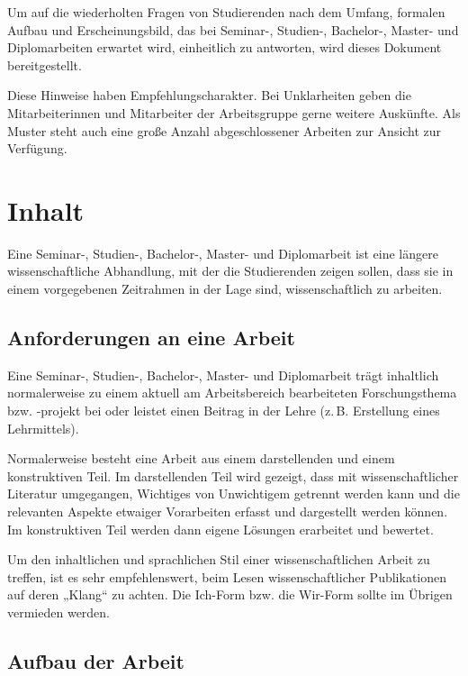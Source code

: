 \documentclass[
    fontsize=12pt,
    headings=small,
    parskip=half,           %
    bibliography=totoc,
    numbers=noenddot,       %
    open=any,               %
    ]{scrreprt}
\begin{document}
Um auf die wiederholten Fragen von Studierenden nach dem Umfang, formalen Aufbau und Erscheinungsbild, das bei Seminar-, Studien-, Bachelor-, Master- und Diplomarbeiten erwartet wird, einheitlich zu antworten, wird dieses Dokument bereitgestellt.

Diese Hinweise haben Empfehlungscharakter. Bei Unklarheiten geben die Mitarbeiterinnen und Mitarbeiter der Arbeitsgruppe gerne weitere Auskünfte. Als Muster steht auch eine große Anzahl abgeschlossener Arbeiten zur Ansicht zur Verfügung.

\chapter{Inhalt}
\label{sec.inhalt}

Eine Seminar-, Studien-, Bachelor-, Master- und Diplomarbeit ist eine längere wissenschaftliche Abhandlung, mit der die Studierenden zeigen sollen, dass sie in einem vorgegebenen Zeitrahmen in der Lage sind, wissenschaftlich zu arbeiten.

\section{Anforderungen an eine Arbeit}
\label{sec.anforderungen}

Eine Seminar-, Studien-, Bachelor-, Master- und Diplomarbeit trägt inhaltlich normalerweise zu einem aktuell am Arbeitsbereich bearbeiteten Forschungsthema bzw. -projekt bei oder leistet einen Beitrag in der Lehre (z.\,B. Erstellung eines Lehrmittels).

Normalerweise besteht eine Arbeit aus einem darstellenden und einem konstruktiven Teil. Im darstellenden Teil wird gezeigt, dass mit wissenschaftlicher Literatur umgegangen, Wichtiges von Unwichtigem getrennt werden kann und die relevanten Aspekte etwaiger Vorarbeiten erfasst und dargestellt werden können. Im konstruktiven Teil werden dann eigene Lösungen erarbeitet und bewertet.

Um den inhaltlichen und sprachlichen Stil einer wissenschaftlichen Arbeit zu treffen, ist es sehr empfehlenswert, beim Lesen wissenschaftlicher Publikationen auf deren „Klang“ \cite{Tolk2003} zu achten. Die Ich-Form bzw. die Wir-Form sollte im Übrigen vermieden werden.

\section{Aufbau der Arbeit}
\label{sec.aufbau}
\end{document}
